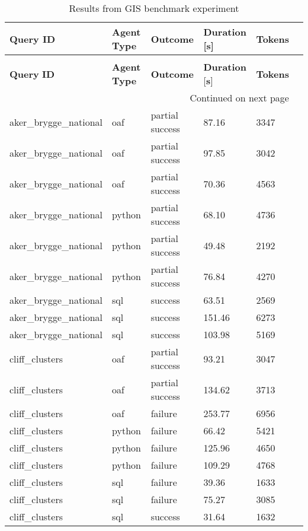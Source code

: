 \begin{longtable}{lp{1.8cm}p{1.8cm}p{1.8cm}p{1.8cm}p{1.8cm}}
\caption{Results from GIS benchmark experiment} \label{tbl:test-results-quantitative} \\
\toprule
\textbf{Query} \textbf{ID} & \textbf{Agent} \textbf{Type} & \textbf{Outcome} & \textbf{Duration} [\textbf{s}] & \textbf{Tokens} \\
\midrule
\endfirsthead
\caption[]{Results from GIS benchmark experiment} \\
\toprule
\textbf{Query} \textbf{ID} & \textbf{Agent} \textbf{Type} & \textbf{Outcome} & \textbf{Duration} [\textbf{s}] & \textbf{Tokens} \\
\midrule
\endhead
\midrule
\multicolumn{5}{r}{Continued on next page} \\
\midrule
\endfoot
\bottomrule
\endlastfoot
aker\_brygge\_national & oaf & partial success & 87.16 & 3347 \\
aker\_brygge\_national & oaf & partial success & 97.85 & 3042 \\
aker\_brygge\_national & oaf & partial success & 70.36 & 4563 \\
aker\_brygge\_national & python & partial success & 68.10 & 4736 \\
aker\_brygge\_national & python & partial success & 49.48 & 2192 \\
aker\_brygge\_national & python & partial success & 76.84 & 4270 \\
aker\_brygge\_national & sql & success & 63.51 & 2569 \\
aker\_brygge\_national & sql & success & 151.46 & 6273 \\
aker\_brygge\_national & sql & success & 103.98 & 5169 \\
cliff\_clusters & oaf & partial success & 93.21 & 3047 \\
cliff\_clusters & oaf & partial success & 134.62 & 3713 \\
cliff\_clusters & oaf & failure & 253.77 & 6956 \\
cliff\_clusters & python & failure & 66.42 & 5421 \\
cliff\_clusters & python & failure & 125.96 & 4650 \\
cliff\_clusters & python & failure & 109.29 & 4768 \\
cliff\_clusters & sql & failure & 39.36 & 1633 \\
cliff\_clusters & sql & failure & 75.27 & 3085 \\
cliff\_clusters & sql & success & 31.64 & 1632 \\

\end{longtable}
